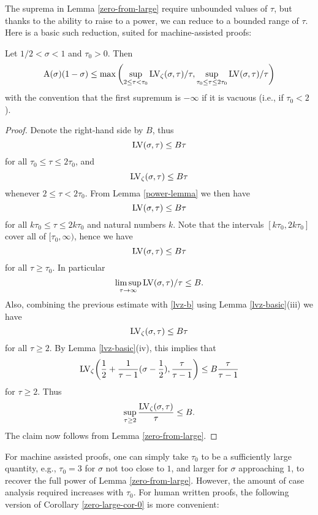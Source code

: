The suprema in Lemma \ref{zero-from-large} require unbounded values of $\tau$, but thanks to the ability to raise to a power, we can reduce to a bounded range of $\tau$.  Here is a basic such reduction, suited for machine-assisted proofs:

\begin{corollary}\label{zero-large-cor-0} Let $1/2 < \sigma < 1$ and $\tau_0 > 0$.  Then
    $$ \mathrm{A}(\sigma)(1-\sigma) \leq \max \left(\sup_{2 \leq \tau < \tau_0} \mathrm{LV}_\zeta(\sigma,\tau)/\tau, \sup_{\tau_0 \leq \tau \leq 2\tau_0} \mathrm{LV}(\sigma,\tau)/\tau\right)$$
    with the convention that the first supremum is $-\infty$ if it is vacuous (i.e., if $\tau_0 < 2$).
\end{corollary}

\begin{proof}
Denote the right-hand side by $B$, thus
    $$ \mathrm{LV}(\sigma,\tau) \leq B\tau$$
    for all $\tau_0 \leq \tau \leq 2\tau_0$, and
    \begin{equation}\label{lvz-b}
         \mathrm{LV}_\zeta(\sigma,\tau) \leq B\tau
    \end{equation}
    whenever $2 \leq \tau < 2\tau_0$.  From Lemma \ref{power-lemma} we then have
    $$ \mathrm{LV}(\sigma,\tau) \leq B\tau$$
    for all $k\tau_0 \leq \tau \leq 2k\tau_0$ and natural numbers $k$. Note that the intervals $[k\tau_0, 2k\tau_0]$ cover all of $[\tau_0,\infty)$, hence we have
    $$ \mathrm{LV}(\sigma,\tau) \leq B\tau$$
    for all $\tau \geq \tau_0$. In particular
    $$ \limsup_{\tau \to \infty} \mathrm{LV}(\sigma,\tau)/\tau  \leq B.$$
    Also, combining the previous estimate with \eqref{lvz-b} using Lemma \ref{lvz-basic}(iii) we have
    \begin{equation}\label{lvzo}
     \mathrm{LV}_\zeta(\sigma,\tau) \leq B\tau
    \end{equation}
    for all $\tau \geq 2$.  By Lemma \ref{lvz-basic}(iv), this implies that
    $$ \mathrm{LV}_\zeta\bigg(\frac{1}{2} + \frac{1}{\tau-1} (\sigma-\frac{1}{2}), \frac{\tau}{\tau-1} \bigg) \leq B \frac{\tau}{\tau-1}$$
    for $\tau \geq 2$.  Thus
    $$ \sup_{\tau \geq 2} \frac{\mathrm{LV}_\zeta(\sigma,\tau)}{\tau} \leq B.$$
    The claim now follows from Lemma \ref{zero-from-large}.
\end{proof}

For machine assisted proofs, one can simply take $\tau_0$ to be a sufficiently large quantity, e.g., $\tau_0=3$ for $\sigma$ not too close to $1$, and larger for $\sigma$ approaching $1$, to recover the full power of Lemma \ref{zero-from-large}.  However, the amount of case analysis required increases with $\tau_0$.  For human written proofs, the following version of Corollary \ref{zero-large-cor-0} is more convenient:

